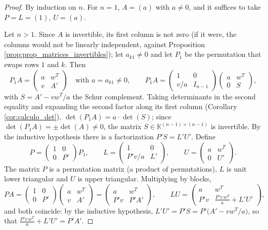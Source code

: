 \documentclass[11pt, a4paper]{article}
\begin{document}
\begin{proof}
By induction on $n$. For $n = 1$, $A = (a)$ with $a \neq 0$, and it suffices to take $P = L = (1)$, $U = (a)$.

Let $n > 1$. Since $A$ is invertible, its first column is not zero (if it were, the columns would not be linearly independent, against Proposition \ref{prop:prop_matrices_invertibles}); let $a_{k1} \neq 0$ and let $P_1$ be the permutation that swaps rows $1$ and $k$. Then
\[
P_1 A = \begin{pmatrix} a & w^T \\ v & A' \end{pmatrix} \quad \text{with } a = a_{k1} \neq 0,
\qquad
P_1 A = \begin{pmatrix} 1 & 0 \\ v/a & I_{n-1} \end{pmatrix} \begin{pmatrix} a & w^T \\ 0 & S \end{pmatrix},
\]
with $S = A' - v w^T / a$ the Schur complement. Taking determinants in the second equality and expanding the second factor along its first column (Corollary \ref{cor:calculo_det}), $\det(P_1 A) = a \cdot \det(S)$; since $\det(P_1 A) = \pm \det(A) \neq 0$, the matrix $S \in \mathbb{K}^{(n-1) \times (n-1)}$ is invertible. By the inductive hypothesis there is a factorization $P' S = L' U'$. Define
\[
P = \begin{pmatrix} 1 & 0 \\ 0 & P' \end{pmatrix} P_1, \qquad
L = \begin{pmatrix} 1 & 0 \\ P'v/a & L' \end{pmatrix}, \qquad
U = \begin{pmatrix} a & w^T \\ 0 & U' \end{pmatrix}.
\]
The matrix $P$ is a permutation matrix (a product of permutations), $L$ is unit lower triangular and $U$ is upper triangular. Multiplying by blocks,
\[
P A = \begin{pmatrix} 1 & 0 \\ 0 & P' \end{pmatrix} \begin{pmatrix} a & w^T \\ v & A' \end{pmatrix}
= \begin{pmatrix} a & w^T \\ P'v & P'A' \end{pmatrix},
\qquad
L U = \begin{pmatrix} a & w^T \\ P'v & \frac{P'v \, w^T}{a} + L'U' \end{pmatrix},
\]
and both coincide: by the inductive hypothesis, $L'U' = P'S = P' \big( A' - v w^T/a \big)$, so that $\frac{P'v \, w^T}{a} + L'U' = P'A'$.
\end{proof}
\end{document}
